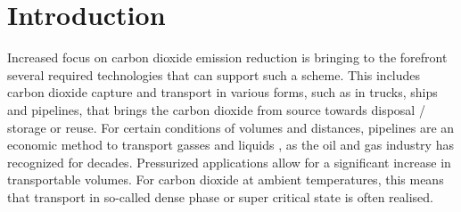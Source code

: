 \documentclass[a4paper, 10pt, twocolumn, twoside]{scrartcl}
\begin{document}
\maketitle
\noindent
\parbox{\columnwidth}{
\setlength{\fboxrule}{0.8pt}
\setlength{\fboxsep}{1.7mm}
{\color{SNE_GRAY}
}
\vspace{-1.55 mm}
}
\normalsize
{}
\fontsize{10.3pt}{1.15em}\selectfont
\section*{Introduction}
Increased focus on carbon dioxide emission reduction is bringing to the forefront several required technologies that can support such a scheme. This includes carbon dioxide capture \cite{andreasen_CC} and transport in various forms, such as in trucks, ships and pipelines, that brings the carbon dioxide from source towards disposal / storage or reuse. For certain conditions of volumes and distances, pipelines are an economic method to transport gasses and liquids \cite{Lu2020}, as the oil and gas industry has recognized for decades. Pressurized applications allow for a significant increase in transportable volumes. For carbon dioxide at ambient temperatures, this means that transport in so-called dense phase or super critical state is often realised. 
\end{document}
